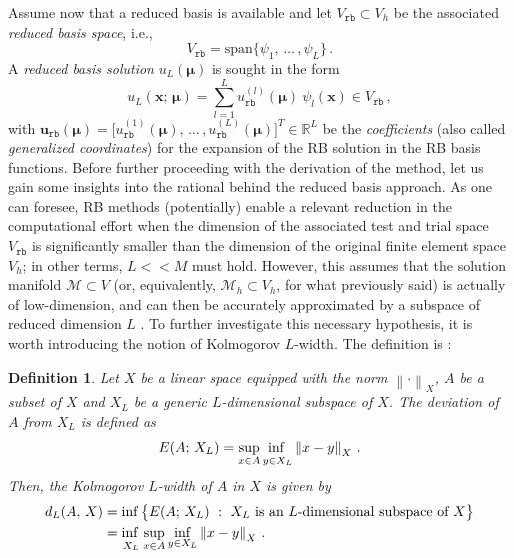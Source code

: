 \documentclass[12pt, a4paper, twoside, openright, notitlepage]{report}
\numberwithin{equation}{chapter}
\theoremstyle{theorem}
\theoremstyle{definition}
\newtheorem{definition}{Definition}[chapter]
\theoremstyle{remark}
\theoremstyle{proposition}
\numberwithin{figure}{chapter}
\newcommand{\norm}[1]{\left\lVert#1\right\rVert}
\newcommand{\bg}[1]{\boldsymbol{#1}}
\begin{document}
		Assume now that a reduced basis is available and let $V_{\texttt{rb}} \subset V_h$ be the associated \emph{reduced basis space}, i.e.,
		\begin{equation*}
			V_{\texttt{rb}} = \text{span} \big\lbrace \psi_1, \, \ldots \, , \psi_L \big\rbrace \, .
		\end{equation*} 
		A \emph{reduced basis solution} $u_{L}(\bg{\mu})$ is sought in the form
		\begin{equation}
			\label{eq:rb-solution}
			u_{L}(\bg{x}; \, \bg{\mu}) = \sum_{l = 1}^L u_{\texttt{rb}}^{(l)}(\bg{\mu}) ~ \psi_l(\bg{x}) \in V_{\texttt{rb}} \, ,
		\end{equation}
		with $\mathbf{u}_{\texttt{rb}}(\bg{\mu}) = \big[ u_{\texttt{rb}}^{(1)}(\bg{\mu}), \, \ldots \, , u_{\texttt{rb}}^{(L)}(\bg{\mu}) \big]^T \in \mathbb{R}^L$ be the \emph{coefficients} (also called \emph{generalized coordinates}) for the expansion of the RB solution in the RB basis functions. Before further proceeding with the derivation of the method, let us gain some insights into the rational behind the reduced basis approach. As one can foresee, RB methods (potentially) enable a relevant reduction in the computational effort when the dimension of the associated test and trial space $V_{\texttt{rb}}$ is significantly smaller than the dimension of the original finite element space $V_h$; in other terms, $L << M$ must hold. However, this assumes that the solution manifold $\mathcal{M} \subset V$ (or, equivalently, $\mathcal{M}_h \subset V_h$, for what previously said) is actually of low-dimension, and can then be accurately approximated by a subspace of reduced dimension $L$ \cite{HSR16}. To further investigate this necessary hypothesis, it is worth introducing the notion of Kolmogorov $L$-width. The definition is \cite{Mad06}:
		
		\begin{definition}
			\emph{
			Let $X$ be a linear space equipped with the norm $\norm{\cdot}_X$, $A$ be a subset of $X$ and $X_L$ be a generic $L$-dimensional subspace of $X$. The deviation of $A$ from $X_L$ is defined as
			\begin{equation*}
				E(A; \, X_L) = \adjustlimits \sup_{x \in A} \inf_{y \in X_L}  \norm{x - y}_X \, .
			\end{equation*}
			Then, the \emph{Kolmogorov $L$-width} of $A$ in $X$ is given by
			\begin{equation}
				\label{eq:kolmogorov-L-width}
				\begin{aligned}
					d_L(A, \, X) & = \inf \big\lbrace E(A; \, X_L) ~ : ~ \text{$X_L$ is an $L$-dimensional subspace of $X$} \big\rbrace \\
					& = \adjustlimits \inf_{X_L} \sup_{x \in A} \inf_{y \in X_L} \norm{x - y}_X \, .
				\end{aligned}
			\end{equation}
			}
		\end{definition}
		
\end{document}
